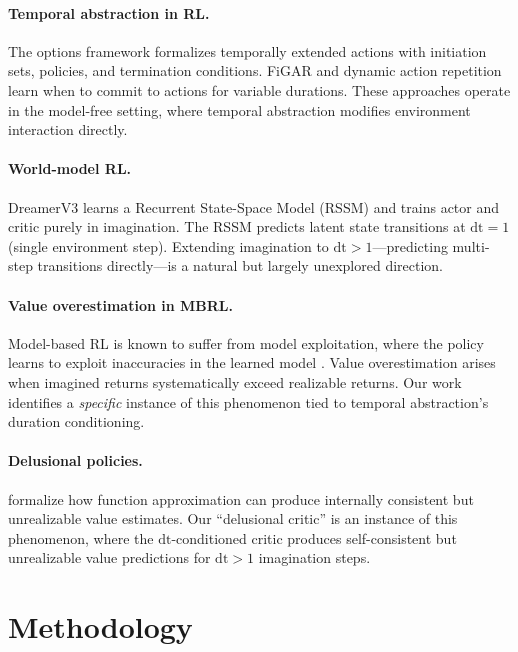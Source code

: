 \documentclass[10pt,letterpaper]{article}
\begin{document}
\paragraph{Temporal abstraction in RL.}
The options framework \citep{sutton1999options} formalizes temporally extended actions with initiation sets, policies, and termination conditions. FiGAR \citep{sharma2017figar} and dynamic action repetition learn when to commit to actions for variable durations. These approaches operate in the model-free setting, where temporal abstraction modifies environment interaction directly.

\paragraph{World-model RL.}
DreamerV3 \citep{hafner2023dreamerv3} learns a Recurrent State-Space Model (RSSM) and trains actor and critic purely in imagination. The RSSM predicts latent state transitions at $\mathrm{dt}{=}1$ (single environment step). Extending imagination to $\mathrm{dt}{>}1$---predicting multi-step transitions directly---is a natural but largely unexplored direction.

\paragraph{Value overestimation in MBRL.}
Model-based RL is known to suffer from model exploitation, where the policy learns to exploit inaccuracies in the learned model \citep{janner2019mbpo}. Value overestimation arises when imagined returns systematically exceed realizable returns. Our work identifies a \emph{specific} instance of this phenomenon tied to temporal abstraction's duration conditioning.

\paragraph{Delusional policies.}
\citet{delalleau2019delusional} formalize how function approximation can produce internally consistent but unrealizable value estimates. Our ``delusional critic'' is an instance of this phenomenon, where the $\mathrm{dt}$-conditioned critic produces self-consistent but unrealizable value predictions for $\mathrm{dt}{>}1$ imagination steps.


\section{Methodology}
\label{sec:method}
\end{document}
